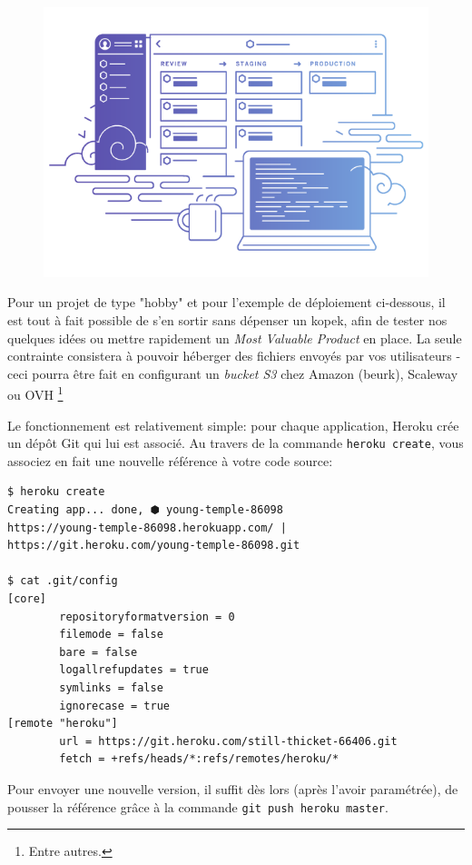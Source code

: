 \documentclass[11pt]{amsbook}
\begin{document}
\begin{figure}[h]{}
\centering\includegraphics[width=2.5truein]{images/deployment/heroku.png}
\caption{}

\end{figure}

Pour un projet de type "hobby" et pour l’exemple de déploiement ci-dessous, il est tout à fait possible de s’en sortir sans dépenser un kopek, afin de tester nos quelques idées ou mettre rapidement un \emph{Most Valuable Product} en place. La seule contrainte consistera à pouvoir héberger des fichiers envoyés par vos utilisateurs - ceci pourra être fait en configurant un \emph{bucket S3} chez Amazon (beurk), Scaleway ou OVH \footnote{Entre autres.}


Le fonctionnement est relativement simple: pour chaque application, Heroku crée un dépôt Git qui lui est associé. Au travers de la commande \texttt{heroku create}, vous associez en fait une nouvelle référence à votre code source:


\begin{verbatim}
$ heroku create
Creating app... done, ⬢ young-temple-86098
https://young-temple-86098.herokuapp.com/ | https://git.heroku.com/young-temple-86098.git

$ cat .git/config
[core]
        repositoryformatversion = 0
        filemode = false
        bare = false
        logallrefupdates = true
        symlinks = false
        ignorecase = true
[remote "heroku"]
        url = https://git.heroku.com/still-thicket-66406.git
        fetch = +refs/heads/*:refs/remotes/heroku/*
\end{verbatim}

Pour envoyer une nouvelle version, il suffit dès lors (après l’avoir paramétrée), de pousser la référence grâce à la commande \texttt{git push heroku master}.
\end{document}
